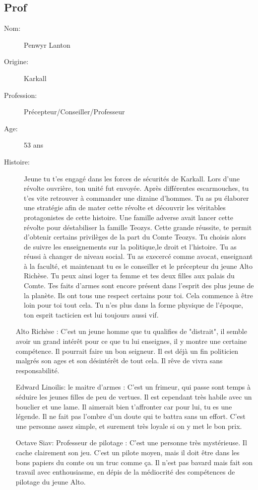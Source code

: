 \documentclass[oneside,12pt]{book}
\begin{document}
\begin{flushleft}
\clearpage
\section{Prof}
\begin{description}
\item[Nom:]{Penwyr Lanton}
\item[Origine:]{Karkall}
\item[Profession:]{Précepteur/Conseiller/Professeur}
\item[Age:]{53 ans}
\item[Histoire:]{
Jeune tu t'es engagé dans les forces de sécurités de Karkall. Lors d'une révolte ouvrière, ton unité fut envoyée. Après différentes escarmouches, tu t'es vite retrouver à commander une dizaine d'hommes. Tu as pu élaborer une stratégie afin de mater cette révolte et découvrir les véritables protagonistes de cette histoire. Une famille adverse avait lancer cette révolte pour déstabiliser la famille Teozys. Cette grande réussite, te permit d'obtenir certains privilèges de la part du Comte Teozys. Tu choisis alors de suivre les enseignements sur la politique,le droit et l'histoire. Tu as réussi à changer de niveau social. Tu as execercé comme avocat, enseignant à la faculté, et maintenant tu es le conseiller et le précepteur du jeune Alto Richèse.
Tu peux ainsi loger ta femme et tes deux filles aux palais du Comte. Tes faits d'armes sont encore présent dans l'esprit des plus jeune de la planète. Ils ont tous une respect certains pour toi. Cela commence à être loin pour toi tout cela. Tu n'es plus dans la forme physique de l'époque, ton esprit tacticien est lui toujours aussi vif.   
}
\end{description}
		\begin{itemize}
		\item[Alto Richèse]: C'est un jeune homme que tu qualifies de "distrait", il semble avoir un grand intérêt pour ce que tu lui enseignes, il y montre une certaine compétence. Il pourrait faire un bon seigneur. Il est déjà un fin politicien malgrés son ages et son désintérêt de tout cela. Il rêve de vivra sans responsabilité.  
		\item[Edward Linoilis: le maitre d'armes]: C'est un frimeur, qui passe sont temps à séduire les jeunes filles de peu de vertues. Il est cependant très habile avec un bouclier et une lame. Il aimerait bien t'affronter car pour lui, tu es une légende. Il ne fait pas l'ombre d'un doute qui te battra sans un effort. C'est une personne assez simple, et surement très loyale si on y met le bon prix.  
		\item[Octave Siav: Professeur de pilotage ]: C'est une personne très mystérieuse. Il cache clairement son jeu. C'est un pilote moyen, mais il doit être dans les bons papiers du comte ou un truc comme ça. Il n'est pas bavard mais fait son travail avec enthousiasme, en dépis de la médiocrité des compétences de pilotage du jeune Alto.
		\end{itemize} 
\clearpage
\clearpage


\end{flushleft}
\end{document}
